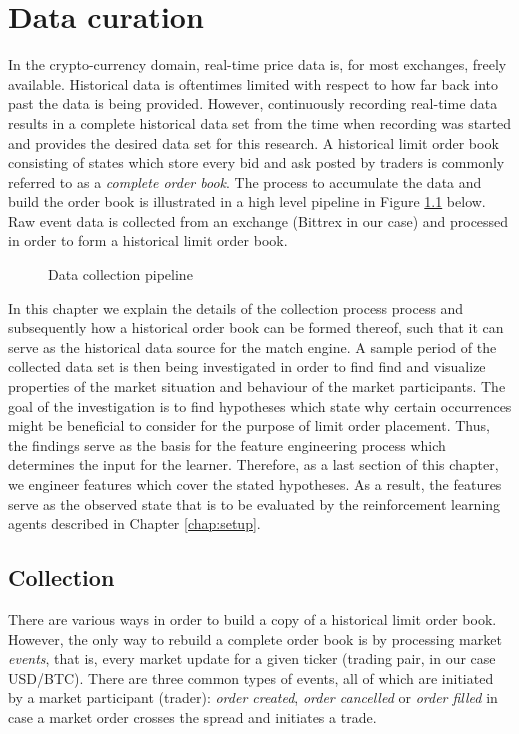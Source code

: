 \chapter{Data curation}
\label{chap:data}

In the crypto-currency domain, real-time price data is, for most exchanges, freely available. 
Historical data is oftentimes limited with respect to how far back into past the data is being provided.
However, continuously recording real-time data results in a complete historical data set from the time when recording was started and provides the desired data set for this research.
A historical limit order book consisting of states which store every bid and ask posted by traders is commonly referred to as a \textit{complete order book}.
The process to accumulate the data and build the order book is illustrated in a high level pipeline in Figure \ref{fig:data-pipeline} below.
Raw event data is collected from an exchange (Bittrex in our case) and processed in order to form a historical limit order book.
\begin{figure}[H]
    \centering
    \caption{Data collection pipeline}
    \label{fig:data-pipeline}
\end{figure}

In this chapter we explain the details of the collection process process and subsequently how a historical order book can be formed thereof, such that it can serve as the historical data source for the match engine.
A sample period of the collected data set is then being investigated in order to find find and visualize properties of the market situation and behaviour of the market participants.
The goal of the investigation is to find hypotheses which state why certain occurrences might be beneficial to consider for the purpose of limit order placement.
Thus, the findings serve as the basis for the feature engineering process which determines the input for the learner.
Therefore, as a last section of this chapter, we engineer features which cover the stated hypotheses.
As a result, the features serve as the observed state that is to be evaluated by the reinforcement learning agents described in Chapter \ref{chap:setup}.

\section{Collection}
\label{sec:data-collection}

There are various ways in order to build a copy of a historical limit order book. However, the only way to rebuild a complete order book is by processing market \textit{events}, that is, every market update for a given ticker (trading pair, in our case USD/BTC).
There are three common types of events, all of which are initiated by a market participant (trader): \textit{order created}, \textit{order cancelled} or \textit{order filled} in case a market order crosses the spread and initiates a trade.

